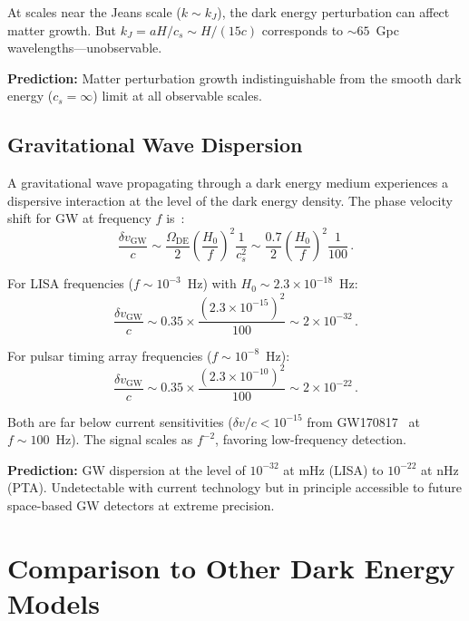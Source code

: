 At scales near the Jeans scale ($k \sim k_J$), the dark energy perturbation can affect matter growth. But $k_J = aH/c_s \sim H/(15c)$ corresponds to ${\sim}65$~Gpc wavelengths---unobservable.

\textbf{Prediction:} Matter perturbation growth indistinguishable from the smooth dark energy ($c_s = \infty$) limit at all observable scales.

\subsection{Gravitational Wave Dispersion}
\label{sec:5-gw-dispersion}

A gravitational wave propagating through a dark energy medium experiences a dispersive interaction at the level of the dark energy density. The phase velocity shift for GW at frequency $f$ is~\cite{ch5:Finn2002}:
\begin{equation}
  \frac{\delta v_\mathrm{GW}}{c}
    \sim \frac{\Omega_\mathrm{DE}}{2}\left(\frac{H_0}{f}\right)^2 \frac{1}{c_s^2}
    \sim \frac{0.7}{2}\left(\frac{H_0}{f}\right)^2 \frac{1}{100}\,.
  \label{eq:5-23}
\end{equation}

For LISA frequencies ($f \sim 10^{-3}$~Hz) with $H_0 \sim 2.3 \times 10^{-18}$~Hz:
\begin{equation}
  \frac{\delta v_\mathrm{GW}}{c}
    \sim 0.35 \times \frac{(2.3 \times 10^{-15})^2}{100}
    \sim 2 \times 10^{-32}\,.
  \label{eq:5-24}
\end{equation}

For pulsar timing array frequencies ($f \sim 10^{-8}$~Hz):
\begin{equation}
  \frac{\delta v_\mathrm{GW}}{c}
    \sim 0.35 \times \frac{(2.3 \times 10^{-10})^2}{100}
    \sim 2 \times 10^{-22}\,.
  \label{eq:5-25}
\end{equation}

Both are far below current sensitivities ($\delta v/c < 10^{-15}$ from GW170817~\cite{ch5:GW170817} at $f \sim 100$~Hz). The signal scales as $f^{-2}$, favoring low-frequency detection.

\textbf{Prediction:} GW dispersion at the level of $10^{-32}$ at mHz (LISA) to $10^{-22}$ at nHz (PTA). Undetectable with current technology but in principle accessible to future space-based GW detectors at extreme precision.

\section{Comparison to Other Dark Energy Models}
\label{sec:5-comparison}

